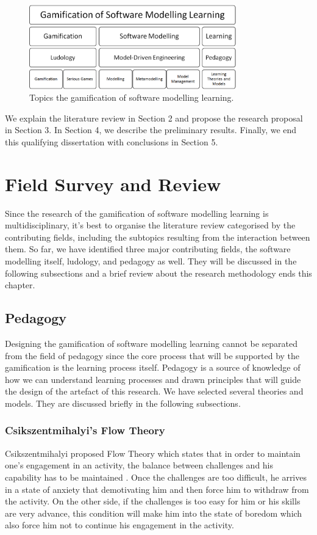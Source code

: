 \documentclass[12pt, a4paper]{report}
\begin{document}
\begin{figure}[ht]
\centering
\includegraphics[width=9cm]{smlg2}
\caption{Topics the gamification of software modelling learning.}
\label{fig:smlg2}
\end{figure}

We explain the literature review in Section 2 and propose the research proposal in Section 3. In Section 4, we describe the preliminary results. Finally, we end this qualifying dissertation with conclusions in Section 5.


\chapter{Field Survey and Review}

Since the research of the gamification of software modelling learning is multidisciplinary, it’s best to organise the literature review categorised by the contributing fields, including the subtopics resulting from the interaction between them. So far, we have identified three major contributing fields, the software modelling itself, ludology, and pedagogy as well. They will be discussed in the following subsections and a brief review about the research methodology ends this chapter.

\section{Pedagogy}
Designing the gamification of software modelling learning cannot be separated from the field of pedagogy since the core process that will be supported by the gamification is the learning process itself. Pedagogy is a source of knowledge of how we can understand learning processes and drawn principles that will guide the design of the artefact of this research. We have selected several theories and models. They are discussed briefly in the following subsections.

\subsection{Csikszentmihalyi's Flow Theory}
Csikszentmihalyi proposed Flow Theory which states that in order to maintain one's engagement in an activity, the balance between challenges and his capability has to be maintained \cite{csikszentmihalyi2014toward}. Once the challenges are too difficult, he arrives in a state of anxiety that demotivating him and  then force him to withdraw from the activity. On the other side, if the challenges is too easy for him or his skills are very advance, this condition will make him into the state of boredom which also force him not to continue his engagement in the activity.
\end{document}
